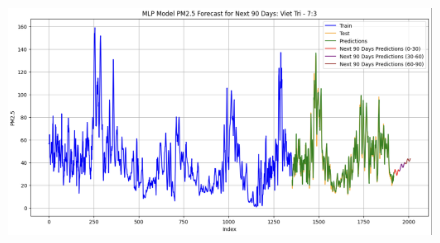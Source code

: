 \begin{figure}[H]
\begin{minipage}{0.15\textwidth}
        \includegraphics[width=1\textwidth, height=0.6\textwidth]{img/final/MLP/90D/MLP_7_3_VT.png}
        \end{minipage}
        \hfill


\end{figure}
